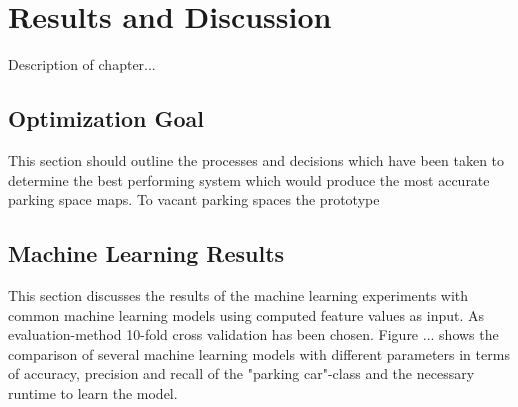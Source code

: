 \chapter{Results and Discussion}
\label{chap:evaluation}

Description of chapter...

\section{Optimization Goal}

This section should outline the processes and decisions which have been taken to determine the best performing system which would produce the most accurate parking space maps. To vacant parking spaces the prototype 


\section{Machine Learning Results}

This section discusses the results of the machine learning experiments with common machine learning models using computed feature values as input. As evaluation-method 10-fold cross validation has been chosen. Figure ... shows the comparison of several machine learning models with different parameters in terms of accuracy, precision and recall of the "parking car"-class and the necessary runtime to learn the model.


\begin{table}



\caption{Results of classic machine learning models applied on the full and filtered dataset.}
\label{table:classic_ml_results}
\end{table}


